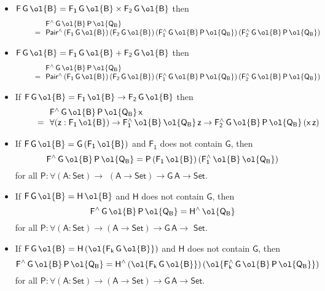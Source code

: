 \documentclass[sigplan,10pt]{acmart}
\begin{document}
\begin{itemize}
\item $\mathsf{F\,G\,\ol{B} = F_1\,G\,\ol{B} \times F_2\,G\,\ol{B}}$ then
\[\begin{array}{ll}
& \!\!\mathsf{F^{\wedge}\,G\,\ol{B}\,P\,\ol{Q_B}}\\
\quad\quad= & \!\!\mathsf{Pair^{\wedge}\,(F_1\,G\,\ol{B})\, (F_2\,G\,\ol{B})\,
  (F_1^{\wedge}\,G\,\ol{B}\,P\,\ol{Q_B})\,
  (F_2^{\wedge}\,G\,\ol{B}\,P\,\ol{Q_B})}
  \end{array}\]
\item $\mathsf{F\,G\,\ol{B} = F_1\,G\,\ol{B} + F_2\,G\,\ol{B}}$ then
\[\begin{array}{ll}
& \!\!\mathsf{F^{\wedge}\,G\,\ol{B}\,P\,\ol{Q_B}}\\
\quad\quad= & \!\!\mathsf{Pair^{\wedge}\,(F_1\,G\,\ol{B})\, (F_2\,G\,\ol{B})\,
  (F_1^{\wedge}\,G\,\ol{B}\,P\,\ol{Q_B})\,
  (F_2^{\wedge}\,G\,\ol{B}\,P\,\ol{Q_B})}
  \end{array}\]
\item If $\mathsf{F\,G\,\ol{B} = F_1\,\ol{B} \to F_2\,G\,\ol{B}}$ then
  \[\begin{array}{ll}
  & \!\!\mathsf{F^{\wedge}\,G\,\ol{B}\,P\,\ol{Q_B}\,x}\\
  \quad\quad= & \!\!\mathsf{\forall (z :
  F_1\,\ol{B}) \to F_1^{\wedge}\,\ol{B}\,\ol{Q_B}\,z \to
  F_2^{\wedge}\,G\,\ol{B}\,P\,\ol{Q_B}\,(x\,z)}
  \end{array}\]
\item If $\mathsf{F\,G\,\ol{B} = G\,(F_1\,\ol{B})}$ and $\mathsf{F_1}$
  does not contain $\mathsf{G}$, then
  \[\mathsf{F^{\wedge}\,G\,\ol{B}\,P\,\ol{Q_B} = P \,(F_1\,\ol{B})\,
    (F_1^{\wedge}\,\ol{B}\,\ol{Q_B})}\] for all $\mathsf{P : \forall (A
    : Set)\to}$ $\mathsf{(A \to Set) \to G\,A \to Set}$.
\item If $\mathsf{F\,G\,\ol{B} = H\,\ol{B}}$ and $\mathsf{H}$ does not
  contain $\mathsf{G}$, then
  \[\mathsf{F^{\wedge}\,G\,\ol{B}\,P\,\ol{Q_B} = H^\wedge\,\ol{Q_B}}\]
  for all $\mathsf{P : \forall (A : Set)\to(A \to Set) \to G\,A \to}$
  $\mathsf{ Set}$.
\item If $\mathsf{F\,G\,\ol{B} = H\, (\ol{F_k\,G\,\ol{B}})}$ and
  $\mathsf{H}$ does not contain $\mathsf{G}$, then
  \[\mathsf{F^{\wedge}\,G\,\ol{B}\,P\,\ol{Q_B} = H^{\wedge}\,
  (\ol{F_k\,G\,\ol{B}})\,
    (\ol{F_k^{\wedge}\,G\,\ol{B}\,P\,\ol{Q_B}})}\] for all $\mathsf{P
    : \forall (A : Set)\to(A \to Set) \to G\,A \to Set}$.
\end{itemize}  
\end{document}
